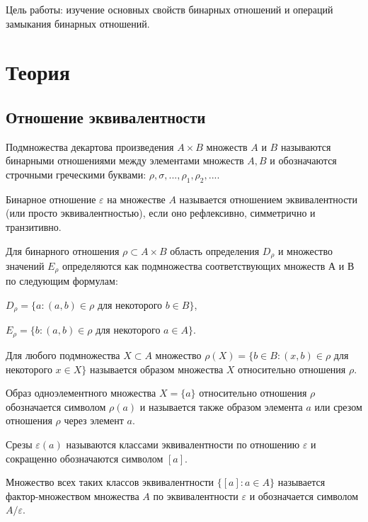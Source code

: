 \documentclass[bachelor, och, labwork]{shiza}
\begin{document}
	
	
	\tableofcontents
	
	\newpage
	
	Цель работы: изучение основных свойств бинарных отношений и операций замыкания бинарных отношений.
	
	\section{Теория}
	    \subsection{Отношение эквивалентности}

	Подмножества декартова произведения $A \times B$ множеств $A$ и $B$ называются бинарными отношениями между элементами множеств $A, B$ и обозначаются строчными греческими буквами: 
$\rho,\sigma, ..., \rho_1, \rho_2, ...   $.
	
	Бинарное отношение $\varepsilon $ на множестве $A$ называется отношением эквивалентности (или просто $\textit{эквивалентностью}$), если оно рефлексивно, симметрично и транзитивно.
	
	Для бинарного отношения $\rho \subset A \times B$ область определения $D_\rho$ и множество значений $E_\rho$ определяются как подмножества соответствующих множеств $А$ и $В$ по следующим формулам:

	$D_\rho = \{a: (a,b) \in \rho $ для некоторого $ b \in B \}$,
	
	
	$E_\rho = \{b: (a,b) \in \rho $ для некоторого $ a \in A \}$.	
	
	Для любого подмножества $X \subset A$ множество $\rho(X) = \{b \in B: (x, b) \in \rho$ для некоторого $x \in X\}$ называется $\textit{образом}$ множества $X$ относительно отношения $\rho$.
	
	Образ одноэлементного множества $X = \{a\}$ относительно отношения $\rho$ обозначается символом $\rho(a)$ и называется также образом элемента $a$ или $\textit{срезом}$ отношения $\rho$ через элемент $a$. 
	
	Срезы $\varepsilon(a)$ называются $\textit{классами эквивалентности}$ по отношению $\varepsilon$ и сокращенно обозначаются символом $[a]$.
	
	Множество всех таких классов эквивалентности $\{[a]: a \in A\}$ называется $\textit{фактор-множеством}$ множества $A$ по эквивалентности $\varepsilon$ и обозначается символом $A/\varepsilon$.
	 
\end{document}
